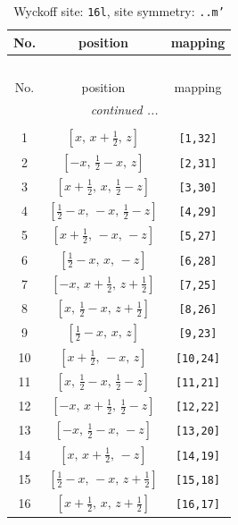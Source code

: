 \documentclass[fleqn,8pt]{jsarticle}
\begin{document}
\renewcommand{\arraystretch}{1.2}
\begin{longtable}{ccc}
\caption{Wyckoff site: {\tt 16l}, site symmetry: {\tt ..m'}}
 \\
 \hline \hline
No. & position & mapping \\ \hline \endfirsthead

\multicolumn{2}{l}{\tablename\ \thetable{}} \\
 \hline \hline
No. & position & mapping \\ \hline \endhead

 \hline \hline
\multicolumn{2}{r}{\footnotesize\it continued ...} \\ \endfoot

 \hline \hline
\multicolumn{2}{r}{} \\ \endlastfoot

1 & $\left[ x,\, x + \frac{1}{2},\, z \right]$ & {\tt [1,32]} \\ \hline
2 & $\left[ - x,\, \frac{1}{2} - x,\, z \right]$ & {\tt [2,31]} \\ \hline
3 & $\left[ x + \frac{1}{2},\, x,\, \frac{1}{2} - z \right]$ & {\tt [3,30]} \\ \hline
4 & $\left[ \frac{1}{2} - x,\, - x,\, \frac{1}{2} - z \right]$ & {\tt [4,29]} \\ \hline
5 & $\left[ x + \frac{1}{2},\, - x,\, - z \right]$ & {\tt [5,27]} \\ \hline
6 & $\left[ \frac{1}{2} - x,\, x,\, - z \right]$ & {\tt [6,28]} \\ \hline
7 & $\left[ - x,\, x + \frac{1}{2},\, z + \frac{1}{2} \right]$ & {\tt [7,25]} \\ \hline
8 & $\left[ x,\, \frac{1}{2} - x,\, z + \frac{1}{2} \right]$ & {\tt [8,26]} \\ \hline
9 & $\left[ \frac{1}{2} - x,\, x,\, z \right]$ & {\tt [9,23]} \\ \hline
10 & $\left[ x + \frac{1}{2},\, - x,\, z \right]$ & {\tt [10,24]} \\ \hline
11 & $\left[ x,\, \frac{1}{2} - x,\, \frac{1}{2} - z \right]$ & {\tt [11,21]} \\ \hline
12 & $\left[ - x,\, x + \frac{1}{2},\, \frac{1}{2} - z \right]$ & {\tt [12,22]} \\ \hline
13 & $\left[ - x,\, \frac{1}{2} - x,\, - z \right]$ & {\tt [13,20]} \\ \hline
14 & $\left[ x,\, x + \frac{1}{2},\, - z \right]$ & {\tt [14,19]} \\ \hline
15 & $\left[ \frac{1}{2} - x,\, - x,\, z + \frac{1}{2} \right]$ & {\tt [15,18]} \\ \hline
16 & $\left[ x + \frac{1}{2},\, x,\, z + \frac{1}{2} \right]$ & {\tt [16,17]} \\
\end{longtable}
\end{document}
